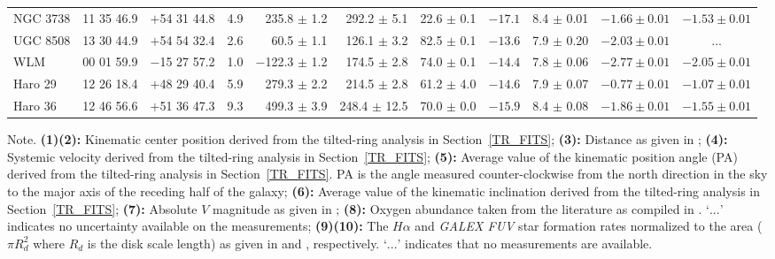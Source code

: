 \documentclass[natbib209]{emulateapj}
\begin{document}
\begin{table}
{\begin{tabular}{@{}lccrrrrrccc}
NGC 3738    & 11 35 46.9 &  $+$54 31 44.8  & 4.9  & 235.8 $\pm$ 1.2 	&  292.2 $\pm$ 5.1 & 22.6 $\pm$ 0.1 & $-17.1$	& 8.4 $\pm$ 0.01	& $-1.66 \pm 0.01$	& $-1.53 \pm 0.01$ \\
UGC 8508    & 13 30 44.9 &  $+$54 54 32.4  & 2.6  & 60.5 $\pm$ 1.1 	&  126.1 $\pm$ 3.2 & 82.5 $\pm$ 0.1 & $-13.6$	& 7.9 $\pm$ 0.20	& $-2.03 \pm 0.01$	& $...$ \\
WLM     	& 00 01 59.9 &  $-$15 27 57.2  & 1.0 & $-$122.3 $\pm$ 1.2 &  174.5 $\pm$ 2.8 & 74.0 $\pm$ 0.1 & $-14.4$	& 7.8 $\pm$ 0.06	        & $-2.77 \pm 0.01$	& $-2.05 \pm 0.01$ \\
Haro 29     & 12 26 18.4 &  $+$48 29 40.4  & 5.9  & 279.3 $\pm$ 2.2	&  214.5 $\pm$ 2.8 & 61.2 $\pm$ 4.0 & $-14.6$	& 7.9 $\pm$ 0.07	& $-0.77 \pm 0.01$	& $-1.07 \pm 0.01$ \\
Haro 36     & 12 46 56.6 &  $+$51 36 47.3  & 9.3  & 499.3 $\pm$ 3.9	&  248.4 $\pm$ 12.5 & 70.0 $\pm$ 0.0 & $-15.9$	& 8.4 $\pm$ 0.08	& $-1.86 \pm 0.01$	& $-1.55 \pm 0.01$  \\
\hline
\end{tabular}}
\begin{minipage}{205mm}
\scriptsize{Note. 
{\bf (1)(2):} Kinematic center position derived from the tilted-ring analysis in Section~\ref{TR_FITS};
{\bf (3):} Distance as given in \cite{Hunter_2012};
{\bf (4):} Systemic velocity derived from the tilted-ring analysis in Section~\ref{TR_FITS}; 
{\bf (5):} Average value of the kinematic position angle (PA) derived from the tilted-ring analysis in Section~\ref{TR_FITS}. PA is the angle measured counter-clockwise from the north direction in the sky to the major axis of the receding half of the galaxy;
{\bf (6):} Average value of the kinematic inclination derived from the tilted-ring analysis in Section~\ref{TR_FITS};
{\bf (7):} Absolute $V$ magnitude as given in \cite{Hunter_2012};
{\bf (8):} Oxygen abundance taken from the literature as compiled in \cite{Hunter_2012}. `$...$' indicates no uncertainty available on the measurements;
{\bf (9)(10):} The $H\alpha$ and {\it GALEX FUV} star formation rates normalized
to the area ($\pi R_{d}^{2}$ where $R_{d}$ is the disk scale length) as given in
\cite{Hunter_2004} and \cite{Hunter_2010}, respectively. `$...$' indicates that no measurements are available.}
\end{minipage}
\end{table}
\end{document}
